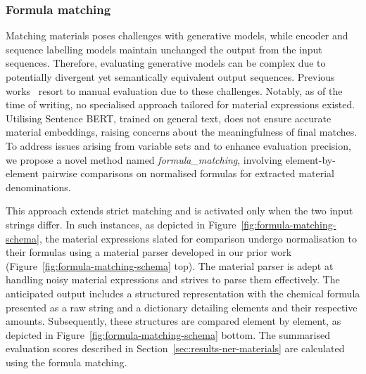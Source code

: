 \subsubsection{Formula matching}

Matching materials poses challenges with generative models, while encoder and sequence labelling models maintain unchanged the output from the input sequences. Therefore, evaluating generative models can be complex due to potentially divergent yet semantically equivalent output sequences. 
Previous works~\cite{taylor2022galactica} resort to manual evaluation due to these challenges. Notably, as of the time of writing, no specialised approach tailored for material expressions existed. 
Utilising Sentence BERT, trained on general text, does not ensure accurate material embeddings, raising concerns about the meaningfulness of final matches. 
To address issues arising from variable sets and to enhance evaluation precision, we propose a novel method named \textit{formula\_matching}, involving element-by-element pairwise comparisons on normalised formulas for extracted material denominations.




This approach extends strict matching and is activated only when the two input strings differ. In such instances, as depicted in Figure~\ref{fig:formula-matching-schema}, the material expressions slated for comparison undergo normalisation to their formulas using a material parser developed in our prior work~\cite{lfoppiano2023automatic} (Figure~\ref{fig:formula-matching-schema} top). 
The material parser is adept at handling noisy material expressions and strives to parse them effectively. The anticipated output includes a structured representation with the chemical formula presented as a raw string and a dictionary detailing elements and their respective amounts. 
Subsequently, these structures are compared element by element, as depicted in Figure~\ref{fig:formula-matching-schema} bottom.
The summarised evaluation scores described in Section~\ref{sec:results-ner-materials} are calculated using the formula matching. 

